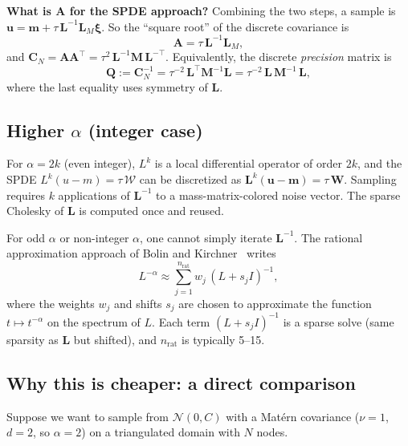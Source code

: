 \documentclass[11pt]{article}
\newcommand{\Cov}{\mathbf{C}}
\newcommand{\bM}{\mathbf{M}}
\newcommand{\bL}{\mathbf{L}}
\newcommand{\bQ}{\mathbf{Q}}
\newcommand{\bA}{\mathbf{A}}
\newcommand{\bu}{\mathbf{u}}
\newcommand{\bmm}{\mathbf{m}}
\newcommand{\bxi}{\boldsymbol{\xi}}
\begin{document}
\medskip\noindent\textbf{What is $\bA$ for the SPDE approach?}  Combining the two steps, a sample is $\bu = \bmm + \tau\, \bL^{-1} \bL_M \bxi$.  So the ``square root'' of the discrete covariance is
\[
  \bA = \tau\, \bL^{-1} \bL_M,
\]
and $\Cov_N = \bA\bA^\top = \tau^2\, \bL^{-1} \bM\, \bL^{-\top}$.  Equivalently, the discrete \emph{precision} matrix is
\begin{equation}\label{eq:Qh}
  \bQ := \Cov_N^{-1} = \tau^{-2}\, \bL^\top \bM^{-1} \bL = \tau^{-2}\, \bL\, \bM^{-1}\, \bL,
\end{equation}
where the last equality uses symmetry of $\bL$.

\subsection{Higher $\alpha$ (integer case)}\label{sec:higher_alpha}

For $\alpha = 2k$ (even integer), $L^k$ is a local differential operator of order $2k$, and the SPDE $L^k(u-m) = \tau\, \mathcal{W}$ can be discretized as $\bL^k (\bu - \bmm) = \tau\, \mathbf{W}$.  Sampling requires $k$ applications of $\bL^{-1}$ to a mass-matrix-colored noise vector.  The sparse Cholesky of $\bL$ is computed once and reused.

For odd $\alpha$ or non-integer $\alpha$, one cannot simply iterate $\bL^{-1}$.  The rational approximation approach of Bolin and Kirchner~\cite{BolinKirchner2020} writes
\[
  L^{-\alpha} \approx \sum_{j=1}^{n_{\text{rat}}} w_j\, (L + s_j I)^{-1},
\]
where the weights $w_j$ and shifts $s_j$ are chosen to approximate the function $t \mapsto t^{-\alpha}$ on the spectrum of $L$.  Each term $(L + s_j I)^{-1}$ is a sparse solve (same sparsity as $\bL$ but shifted), and $n_{\text{rat}}$ is typically 5--15.

\subsection{Why this is cheaper: a direct comparison}\label{sec:SPDE_cost_compare}

Suppose we want to sample from $\mathcal{N}(0, C)$ with a Mat\'ern covariance ($\nu = 1$, $d = 2$, so $\alpha = 2$) on a triangulated domain with $N$ nodes.
\end{document}
